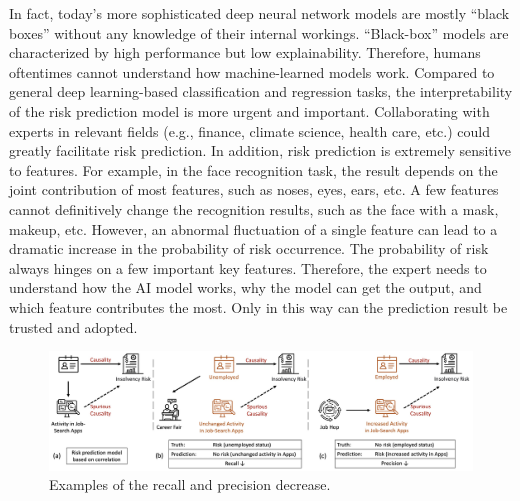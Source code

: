 \documentclass[letterpaper]{article} %
\theoremstyle{definition}
\theoremstyle{remark}
\begin{document}
In fact, today’s more sophisticated deep neural network models are mostly ``black boxes'' without any knowledge of their internal workings. ``Black-box'' models are characterized by high performance but low explainability. Therefore, humans oftentimes cannot understand how machine-learned models work. Compared to general deep learning-based classification and regression tasks, the interpretability of the risk prediction model is more urgent and important. Collaborating with experts in relevant fields (e.g., finance, climate science, health care, etc.) could greatly facilitate risk prediction. In addition, risk prediction is extremely sensitive to features. For example, in the face recognition task, the result depends on the joint contribution of most features, such as noses, eyes, ears, etc. A few features cannot definitively change the recognition results, such as the face with a mask, makeup, etc. However, an abnormal fluctuation of a single feature can lead to a dramatic increase in the probability of risk occurrence. The probability of risk always hinges on a few important key features. Therefore, the expert needs to understand how the AI model works, why the model can get the output, and which feature contributes the most. Only in this way can the prediction result be trusted and adopted. 
\begin{figure}
  \centering
  \includegraphics[width=0.8\linewidth]{causal_correlation.jpg}
  \vspace{-3mm}
  \caption{Examples of the recall and precision decrease.}
  \vspace{-5mm}
  \label{fig:correlation}
\end{figure}
\end{document}
